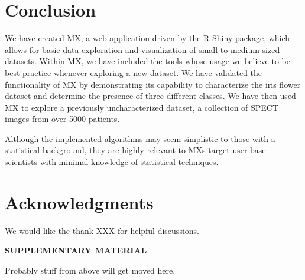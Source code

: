 \documentclass[12pt]{article}
\begin{document}
\section{Conclusion}
\label{sec:conc}

We have created MX, a web application driven by the R Shiny package, which allows for basic data exploration and visualization of small to medium sized datasets. Within MX, we have included the tools whose usage we believe to be best practice whenever exploring a new dataset. We have validated the functionality of MX by demonstrating its capability to characterize the iris flower dataset and determine the presence of three different classes. We have then used MX to explore a previously uncharacterized dataset, a collection of SPECT images from over 5000 patients.

Although the implemented algorithms may seem simplistic to those with a statistical background, they are highly relevant to MXs target user base: scientists with minimal knowledge of statistical techniques.

\section{Acknowledgments}
\label{sec:ack}
We would like the thank XXX for helpful discussions.

\bigskip
\begin{center}
{\large\bf SUPPLEMENTARY MATERIAL}
\end{center}

Probably stuff from above will get moved here.




\end{document}
